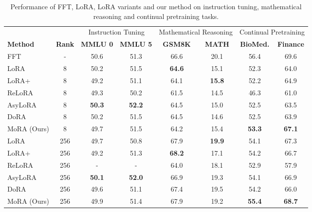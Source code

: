 \documentclass[11pt]{article}
\begin{document}
\begin{table}[t]
\label{tab:main_results}
\centering
\begin{tabular}{lccccccc}
\toprule
&   & \multicolumn{2}{c}{Instruction Tuning} &   \multicolumn{2}{c}{Mathematical Reasoning} & \multicolumn{2}{c}{Continual Pretraining} \\ \cmidrule(lr){3-8}
\textbf{Method} &  \textbf{Rank} & \textbf{MMLU 0} & \textbf{MMLU 5} & \textbf{GSM8K} & \textbf{MATH} & \textbf{BioMed.} &\textbf{Finance} \\
 \midrule
 FFT      & - & 50.6 & 51.3 & 66.6 & 20.1 & 56.4 & 69.6 \\
 \hline
 LoRA        &  8  & 50.2          &51.5          & \textbf{64.6}&15.1 &          52.3 & 64.0 \\
LoRA+        &  8  & 49.2          &51.1          & 64.1&\textbf{15.8} &          52.2 & 64.9 \\
ReLoRA        &  8  & 49.3          &50.2          & 61.5&14.5 &          46.3  & 61.0\\
AsyLoRA      &  8  & \textbf{50.3} &\textbf{52.2} & 64.5&15.0 &          52.5  & 63.5\\
DoRA         &  8  & 50.2          &51.5          & 64.5&14.6 &          52.5  & 63.9\\
MoRA (Ours)  &  8  & 49.7          &51.5          & 64.2&15.4 &          \textbf{53.3} & \textbf{67.1} \\
\hline
 LoRA        & 256 & 49.7          &50.8          & 67.9&\textbf{19.9} &          54.1 & 67.3 \\
 LoRA+       & 256 & 49.2          &51.3          & \textbf{68.2}&17.1 &          54.2 & 66.7\\
 ReLoRA       & 256 & -             & -            & 64.0&18.1 &          52.9  & 57.9\\
 AsyLoRA     & 256 & \textbf{50.1} &\textbf{52.0} & 66.9&19.3 &          54.1  & 66.9\\
 DoRA        & 256 & 49.6          &51.1          & 67.4&19.5 &          54.2 & 66.0 \\
 MoRA (Ours) & 256 & 49.9          &51.4          & 67.9&19.2 &          \textbf{55.4}  & \textbf{68.7}\\
\bottomrule
\end{tabular}
\caption{Performance of FFT, LoRA, LoRA variants and our method on instruction tuning, mathematical reasoning and continual pretraining tasks.}
\label{tab:main_results}
\end{table}
\end{document}
